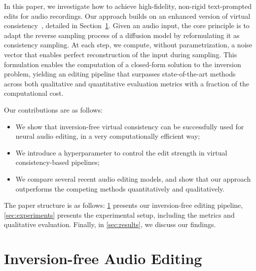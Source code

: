 In this paper, we investigate how to achieve high-fidelity, non-rigid text-prompted edits for audio recordings. Our approach builds on an enhanced version of virtual consistency~\cite{infedit}, detailed in Section~\ref{sec:method}. Given an audio input, the core principle is to adapt the reverse sampling process of a diffusion model by reformulating it as consistency sampling. At each step, we compute, without parametrization, a noise vector that enables perfect reconstruction of the input during sampling. This formulation enables the computation of a closed-form solution to the inversion problem, yielding an editing pipeline that surpasses state-of-the-art methods across both qualitative and quantitative evaluation metrics with a fraction of the computational cost.

\noindent Our contributions are as follows:
\begin{itemize}
    \setlength\itemsep{.003cm}
    \item We show that inversion-free virtual consistency can be successfully used for neural audio editing, in a very computationally efficient way;
    \item We introduce a hyperparameter to control the edit strength in virtual consistency-based pipelines;
    \item We compare several recent audio editing models, and show that our approach outperforms the competing methods quantitatively and qualitatively. 
\end{itemize}

The paper structure is as follows: \cref{sec:method} presents our inversion-free editing pipeline, \cref{sec:experiments} presents the experimental setup, including the metrics and qualitative evaluation. Finally, in \cref{sec:results}, we discuss our findings.

\section{Inversion-free Audio Editing}\label{sec:method}

